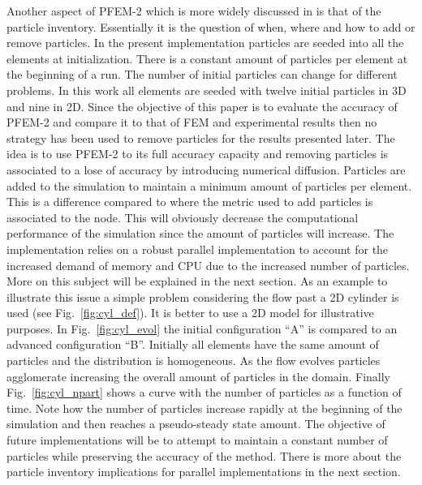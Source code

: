 Another aspect of PFEM-2 which is more widely discussed in \cite{gimenez-difusion} is that of the particle inventory. Essentially it is the question of when, where and how to add or remove particles. In the present implementation particles are seeded into all the elements at initialization. There is a constant amount of particles per element at the beginning of a run. The number of initial particles can change for different problems. In this work all elements are seeded with twelve initial particles in 3D and nine in 2D. Since the objective of this paper is to evaluate the accuracy of PFEM-2 and compare it to that of FEM and experimental results then no strategy has been used to remove particles for the results presented later. The idea is to use PFEM-2 to its full accuracy capacity and removing particles is associated to a lose of accuracy by introducing numerical diffusion. Particles are added to the simulation to maintain a minimum amount of particles per element. This is a difference compared to \cite{gimenez-difusion} where the metric used to add particles is associated to the node. This will obviously decrease the computational performance of the simulation since the amount of particles will increase. The implementation relies on a robust parallel implementation to account for the increased demand of memory and CPU due to the increased number of particles. More on this subject will be explained in the next section. As an example to illustrate this issue a simple problem considering the flow past a 2D cylinder is used (see Fig.~\ref{fig:cyl_def}). It is better to use a 2D model for illustrative purposes. In Fig.~\ref{fig:cyl_evol} the initial configuration ``A'' is compared to an advanced configuration ``B''. Initially all elements have the same amount of particles and the distribution is homogeneous. As the flow evolves particles agglomerate increasing the overall amount of particles in the domain. Finally Fig.~\ref{fig:cyl_npart} shows a curve with the number of particles as a function of time. Note how the number of particles increase rapidly at the beginning of the simulation and then reaches a pseudo-steady state amount. The objective of future implementations will be to attempt to maintain a constant number of particles while preserving the accuracy of the method. There is more about the particle inventory implications for parallel implementations in the next section.
%
